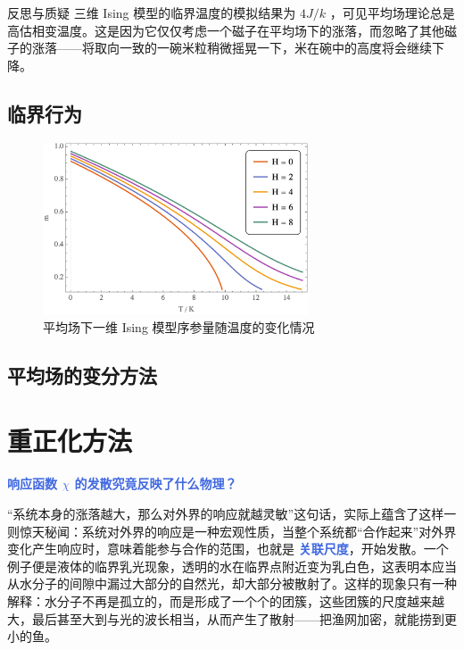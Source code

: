 \begin{justification}{\kaishu 反思与质疑}
\kaishu \fontsize{11pt}{16pt}
\quad\quad 三维 Ising 模型的临界温度的模拟结果为 $4J/k $ ，可见平均场理论总是高估相变温度。这是因为它仅仅考虑一个磁子在平均场下的涨落，而忽略了其他磁子的涨落——将取向一致的一碗米粒稍微摇晃一下，米在碗中的高度将会继续下降。
\end{justification}

\subsection{临界行为}\label{sub:临界行为}

\begin{figure}[ht]
    \centering
    \includegraphics[width=0.7\textwidth]{figures/one-dim-ising.png}
    \caption{\kaishu 平均场下一维 Ising 模型序参量随温度的变化情况}
    \label{fig:one-dim-ising}
\end{figure}


\subsection{平均场的变分方法}\label{sub:平均场的变分方法}


\section{重正化方法}

\textcolor{RoyalBlue}{\textbf{\kaishu 响应函数 $\chi$ 的发散究竟反映了什么物理？}}

“系统本身的涨落越大，那么对外界的响应就越灵敏”这句话，实际上蕴含了这样一则惊天秘闻：系统对外界的响应是一种宏观性质，当整个系统都“合作起来”对外界变化产生响应时，意味着能参与合作的范围，也就是 \textcolor{RoyalBlue}{\textbf{\kaishu 关联尺度}}，开始发散。一个例子便是液体的临界乳光现象，透明的水在临界点附近变为乳白色，这表明本应当从水分子的间隙中漏过大部分的自然光，却大部分被散射了。这样的现象只有一种解释：水分子不再是孤立的，而是形成了一个个的团簇，这些团簇的尺度越来越大，最后甚至大到与光的波长相当，从而产生了散射——把渔网加密，就能捞到更小的鱼。

